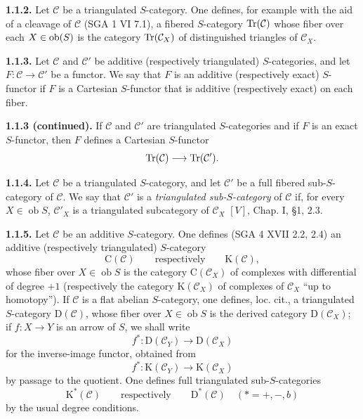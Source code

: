 \documentclass[11pt]{article}
\providecommand{\cC}{\mathcal C}
\providecommand{\Coker}{\operatorname{Coker}}
\providecommand{\Ker}{\operatorname{Ker}}
\providecommand{\cO}{\mathcal O}
\begin{document}
\textbf{1.1.2.} Let \(\mathcal C\) be a triangulated \(S\)-category. One defines, for example with the aid of a cleavage of \(\mathcal C\) (SGA 1 VI 7.1), a fibered \(S\)-category \(\operatorname{Tr}(\mathcal C)\) whose fiber over each \(X\in \operatorname{ob}(S)\) is the category \(\operatorname{Tr}(\mathcal C_X)\) of distinguished triangles of \(\mathcal C_X\).

\textbf{1.1.3.} Let \(\mathcal C\) and \(\mathcal C'\) be additive (respectively triangulated) \(S\)-categories, and let \(F:\mathcal C\to\mathcal C'\) be a functor. We say that \(F\) is an additive (respectively exact) \(S\)-functor if \(F\) is a Cartesian \(S\)-functor that is additive (respectively exact) on each fiber.



\providecommand{\cC}{\mathcal C}
\providecommand{\cD}{\mathcal D}
\providecommand{\cK}{\mathcal K}
\providecommand{\cO}{\mathcal O}
\providecommand{\cS}{\mathcal S}
\providecommand{\Cpx}{\mathrm C}
\providecommand{\Kpx}{\mathrm K}
\providecommand{\Dpx}{\mathrm D}
\providecommand{\D}{\mathrm D}
\providecommand{\Ho}{\mathrm H}
\providecommand{\Ob}{\operatorname{ob}}
\providecommand{\Coker}{\operatorname{Coker}}
\providecommand{\Ker}{\operatorname{Ker}}
\providecommand{\Im}{\operatorname{Im}}
\providecommand{\Hom}{\operatorname{Hom}}
\providecommand{\Cone}{\operatorname{Cone}}
\providecommand{\id}{\operatorname{Id}}
\providecommand{\qis}{\xrightarrow{\sim}}


\textbf{1.1.3 (continued).} If \(\mathcal C\) and \(\mathcal C'\) are triangulated \(S\)-categories and if \(F\) is an exact \(S\)-functor, then \(F\) defines a Cartesian \(S\)-functor
\[
  \operatorname{Tr}(\mathcal C)\longrightarrow \operatorname{Tr}(\mathcal C').
\]

\textbf{1.1.4.} Let \(\mathcal C\) be a triangulated \(S\)-category, and let \(\mathcal C'\) be a full fibered sub-\(S\)-category of \(\mathcal C\). We say that \(\mathcal C'\) is a \emph{triangulated sub-\(S\)-category} of \(\mathcal C\) if, for every \(X\in\Ob S\), \(\mathcal C'_X\) is a triangulated subcategory of \(\mathcal C_X\) \([V]\), Chap. I, §1, 2.3.

\textbf{1.1.5.} Let \(\mathcal C\) be an additive \(S\)-category. One defines (SGA 4 XVII 2.2, 2.4) an additive (respectively triangulated) \(S\)-category
\[
  \Cpx(\mathcal C)\qquad\text{respectively}\qquad \Kpx(\mathcal C),
\]
whose fiber over \(X\in\Ob S\) is the category \(\Cpx(\mathcal C_X)\) of complexes with differential of degree \(+1\) (respectively the category \(\Kpx(\mathcal C_X)\) of complexes of \(\mathcal C_X\) ``up to homotopy''). If \(\mathcal C\) is a flat abelian \(S\)-category, one defines, loc. cit., a triangulated \(S\)-category \(\Dpx(\mathcal C)\), whose fiber over \(X\in\Ob S\) is the derived category \(\Dpx(\mathcal C_X)\); if \(f:X\to Y\) is an arrow of \(S\), we shall write
\[
  f^*:\Dpx(\mathcal C_Y)\longrightarrow \Dpx(\mathcal C_X)
\]
for the inverse-image functor, obtained from
\[
  f^*:\Kpx(\mathcal C_Y)\longrightarrow \Kpx(\mathcal C_X)
\]
by passage to the quotient. One defines full triangulated sub-\(S\)-categories
\[
  \Kpx^*(\mathcal C)\qquad\text{respectively}\qquad \Dpx^*(\mathcal C)
  \quad (*=+,-,b)
\]
by the usual degree conditions.
\end{document}
